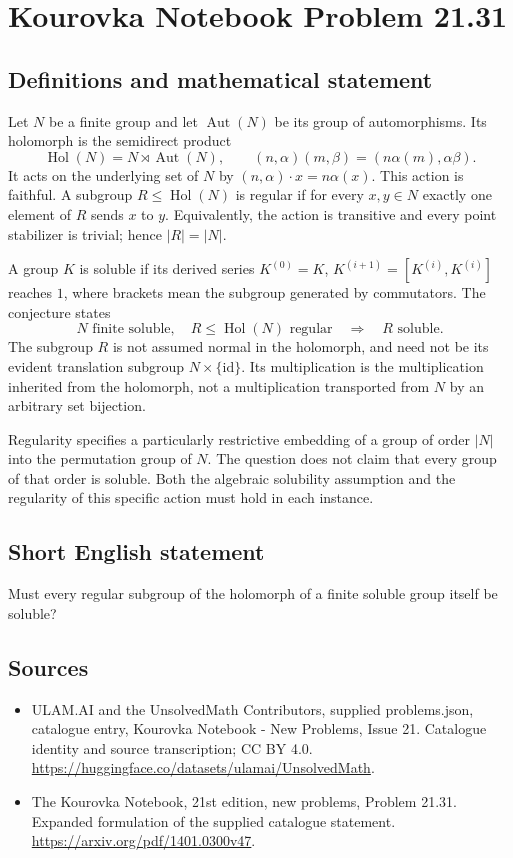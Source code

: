 \documentclass[11pt,a4paper]{article}
\begin{document}
\section*{Kourovka Notebook Problem 21.31}\label{statement}

\subsection{Definitions and mathematical statement}
Let $N$ be a finite group and let $\operatorname{Aut}(N)$ be its group
of automorphisms. Its holomorph is the semidirect product
\[
 \operatorname{Hol}(N)=N\rtimes\operatorname{Aut}(N),\qquad
 (n,\alpha)(m,\beta)=(n\alpha(m),\alpha\beta).
\]
It acts on the underlying set of $N$ by $(n,\alpha)\cdot x=n\alpha(x)$.
This action is faithful. A subgroup $R\le\operatorname{Hol}(N)$ is
regular if for every $x,y\in N$ exactly one element of $R$ sends $x$
to $y$. Equivalently, the action is transitive and every point stabilizer
is trivial; hence $|R|=|N|$.

A group $K$ is soluble if its derived series $K^{(0)}=K$,
$K^{(i+1)}=[K^{(i)},K^{(i)}]$ reaches $1$, where brackets mean the
subgroup generated by commutators.
The conjecture states
\[
 N\text{ finite soluble},\quad R\le\operatorname{Hol}(N)\text{ regular}
 \quad\Longrightarrow\quad R\text{ soluble}.
\]
The subgroup $R$ is not assumed normal in the holomorph, and need not
be its evident translation subgroup $N\times\{\mathrm{id}\}$.
Its multiplication is the multiplication inherited from the holomorph,
not a multiplication transported from $N$ by an arbitrary set bijection.

Regularity specifies a particularly restrictive embedding of a group of
order $|N|$ into the permutation group of $N$. The question does not
claim that every group of that order is soluble. Both the algebraic
solubility assumption and the regularity of this specific action must
hold in each instance.
\subsection{Short English statement}
Must every regular subgroup of the holomorph of a finite soluble group itself be soluble?
\subsection{Sources}
\begin{itemize}
\item[S1] ULAM.AI and the UnsolvedMath Contributors, supplied problems.json, catalogue entry, Kourovka Notebook - New Problems, Issue 21. Catalogue identity and source transcription; CC BY 4.0.
\url{https://huggingface.co/datasets/ulamai/UnsolvedMath}.
\item[S2] The Kourovka Notebook, 21st edition, new problems, Problem 21.31. Expanded formulation of the supplied catalogue statement.
\url{https://arxiv.org/pdf/1401.0300v47}.
\end{itemize}
\end{document}
